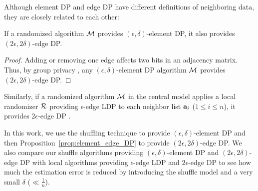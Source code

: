 

Although element DP and edge DP have different definitions of neighboring data, they are closely related to each other:

\begin{proposition}\label{prop:element_edge_DP}
If a randomized algorithm $\mathcal{M}$ provides $(\epsilon, \delta)$-element DP, it also provides $(2\epsilon, 2\delta)$-edge DP. 
\end{proposition}
\begin{proof}
Adding or removing one edge affects two bits in an adjacency matrix. 
Thus, by group privacy \cite{DP}, any 
$(\epsilon, \delta)$-element DP 
algorithm $\mathcal{M}$ 
provides $(2\epsilon, 2\delta)$-edge DP. 
\end{proof}
Similarly, if 
a randomized algorithm $\mathcal{M}$ in the central model 
applies a local randomizer $\mathcal{R}$ providing $\epsilon$-edge LDP to each neighbor list $\mathbf{a}_i$ ($1 \leq i \leq n$), it provides $2\epsilon$-edge DP \cite{Imola_USENIX21}. 

In this work, we use the shuffling technique to provide $(\epsilon, \delta)$-element DP and then Proposition~\ref{prop:element_edge_DP} to provide $(2\epsilon, 2\delta)$-edge DP. 
We also compare our shuffle algorithms providing $(\epsilon, \delta)$-element DP and $(2\epsilon, 2\delta)$-edge DP with local algorithms providing $\epsilon$-edge LDP and $2\epsilon$-edge DP to see how much the estimation error is reduced by introducing the shuffle model and a very small $\delta$ ($\ll \frac{1}{n}$). 

